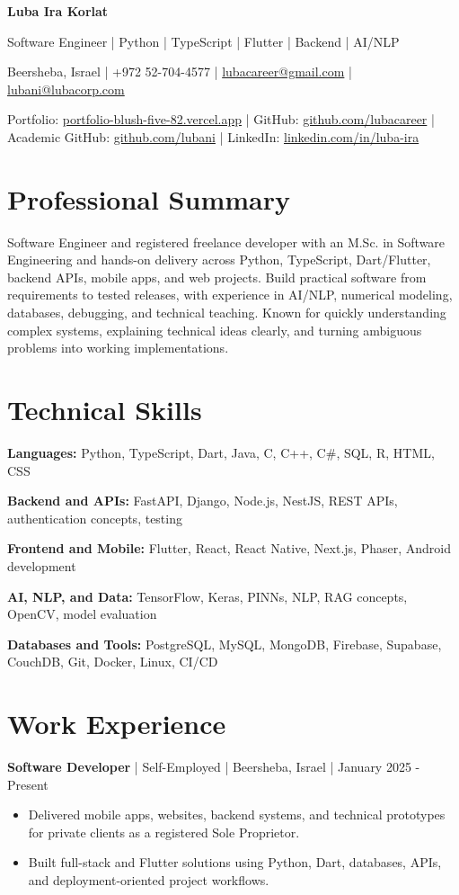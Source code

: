 \documentclass[11pt,a4paper]{article}
\newcommand{\workentry}[5]{%
  \Needspace{5\baselineskip}
  \textbf{#1} | #2 | #3 | #4\par
  \begin{itemize}
    #5
  \end{itemize}
}
\begin{document}
{\LARGE\textbf{Luba Ira Korlat}}\par
\vspace{2pt}
Software Engineer | Python | TypeScript | Flutter | Backend | AI/NLP\par
\vspace{3pt}
Beersheba, Israel | +972 52-704-4577 | \href{mailto:lubacareer@gmail.com}{lubacareer@gmail.com} | \href{mailto:lubani@lubacorp.com}{lubani@lubacorp.com}\par
Portfolio: \href{https://portfolio-blush-five-82.vercel.app/}{portfolio-blush-five-82.vercel.app} | GitHub: \href{https://github.com/lubacareer}{github.com/lubacareer} | Academic GitHub: \href{https://github.com/lubani}{github.com/lubani} | LinkedIn: \href{https://www.linkedin.com/in/luba-ira}{linkedin.com/in/luba-ira}\par

\section*{Professional Summary}
Software Engineer and registered freelance developer with an M.Sc. in Software Engineering and hands-on delivery across Python, TypeScript, Dart/Flutter, backend APIs, mobile apps, and web projects. Build practical software from requirements to tested releases, with experience in AI/NLP, numerical modeling, databases, debugging, and technical teaching. Known for quickly understanding complex systems, explaining technical ideas clearly, and turning ambiguous problems into working implementations.

\section*{Technical Skills}
\textbf{Languages:} Python, TypeScript, Dart, Java, C, C++, C\#, SQL, R, HTML, CSS\par
\textbf{Backend and APIs:} FastAPI, Django, Node.js, NestJS, REST APIs, authentication concepts, testing\par
\textbf{Frontend and Mobile:} Flutter, React, React Native, Next.js, Phaser, Android development\par
\textbf{AI, NLP, and Data:} TensorFlow, Keras, PINNs, NLP, RAG concepts, OpenCV, model evaluation\par
\textbf{Databases and Tools:} PostgreSQL, MySQL, MongoDB, Firebase, Supabase, CouchDB, Git, Docker, Linux, CI/CD

\section*{Work Experience}
\workentry{Software Developer}{Self-Employed}{Beersheba, Israel}{January 2025 - Present}{
  \item Delivered mobile apps, websites, backend systems, and technical prototypes for private clients as a registered Sole Proprietor.
  \item Built full-stack and Flutter solutions using Python, Dart, databases, APIs, and deployment-oriented project workflows.
}
\end{document}
